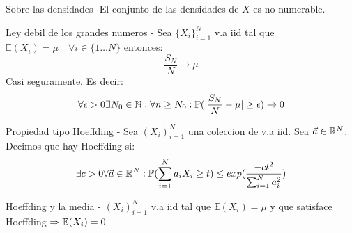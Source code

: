 \begin{Proposition}{Sobre las densidades}
    -El conjunto de las densidades de $X$ es no numerable.
\end{Proposition}

\begin{Theorem}{Ley debil de los grandes numeros}
    - Sea $\{ X_i \}_{i=1}^N$ v.a iid tal que $\mathbb{E}(X_i) = \mu \quad \forall i \in \{ 1 \dots N \}$
    entonces:
    $$ \frac{S_N}{N} \rightarrow \mu $$
    Casi seguramente. Es decir:
    $$ \forall \epsilon > 0 \exists N_0 \in \mathbb{N} : \forall n \geq N_0 : \mathbb{P}(| \frac{S_N}{N} - \mu | \geq \epsilon) \rightarrow 0$$
\end{Theorem}

\begin{Definition}{Propiedad tipo Hoeffding}
    - Sea $(X_i)_{i=1}^N$ una coleccion de v.a iid. Sea $\vec{a} \in \mathbb{R}^N$. Decimos que hay Hoeffding si:
    $$ \exists c > 0 \forall \vec{a} \in \mathbb{R}^N: \mathbb{P}(\sum_{i=1}^{N} a_i X_i \geq t )  \leq exp( \frac{-ct^2}{\sum_{i=1}^{N} a_i^2})$$
\end{Definition}

\begin{Proposition}{Hoeffding y la media}
    - $ (X_i)_{i=1}^N $ v.a iid tal que $ \mathbb{E}(X_i) = \mu $ y que satisface Hoeffding
    $\Rightarrow \mathbb{E}(X_i) = 0$
\end{Proposition}